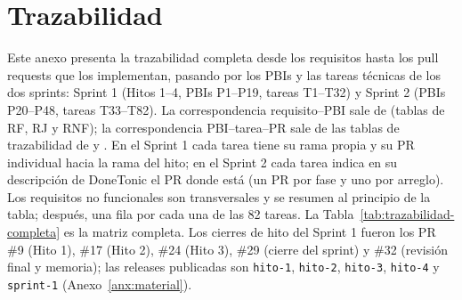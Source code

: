\chapter{Trazabilidad}
\label{anx:trazabilidad}

Este anexo presenta la trazabilidad completa desde los requisitos hasta los pull requests que los implementan, pasando por los PBIs y las tareas técnicas de los dos sprints: Sprint 1 (Hitos 1--4, PBIs P1--P19, tareas T1--T32) y Sprint 2 (PBIs P20--P48, tareas T33--T82). La correspondencia requisito--PBI sale de  (tablas de RF, RJ y RNF); la correspondencia PBI--tarea--PR sale de las tablas de trazabilidad de  y . En el Sprint 1 cada tarea tiene su rama propia y su PR individual hacia la rama del hito; en el Sprint 2 cada tarea indica en su descripción de DoneTonic el PR donde está (un PR por fase y uno por arreglo). Los requisitos no funcionales son transversales y se resumen al principio de la tabla; después, una fila por cada una de las 82 tareas. La Tabla~\ref{tab:trazabilidad-completa} es la matriz completa. Los cierres de hito del Sprint 1 fueron los PR \#9 (Hito 1), \#17 (Hito 2), \#24 (Hito 3), \#29 (cierre del sprint) y \#32 (revisión final y memoria); las releases publicadas son \texttt{hito-1}, \texttt{hito-2}, \texttt{hito-3}, \texttt{hito-4} y \texttt{sprint-1} (Anexo~\ref{anx:material}).

